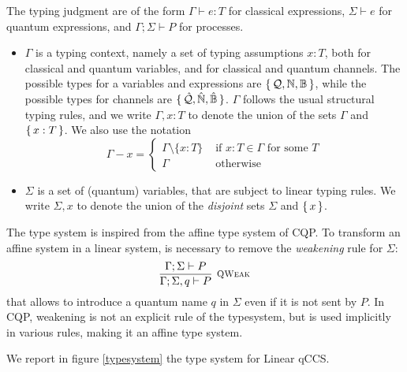 The typing judgment are of the form $\Gamma \vdash e : T$ for classical expressions, $\Sigma \vdash e$ for quantum expressions, and $\Gamma; \Sigma \vdash P$ for processes.
\begin{itemize}
\item $\Gamma$ is a typing context, namely a set of typing assumptions $x:T$, both for classical and quantum variables, and for classical and quantum channels. The possible types for a variables and expressions are $\set{\mathcal{Q}, \mathbb{N}, \mathbb{B}}$, while the possible types for channels are $\set{\hat{\mathcal{Q}}, \hat{\mathbb{N}}, \hat{\mathbb{B}}}$. $\Gamma$ follows the usual structural typing rules, and we write $\Gamma, x: T$ to denote the union of the sets $\Gamma$ and $\set{x: T}$. We also use the notation
\[\Gamma - x = \begin{cases}
\Gamma \setminus \{x : T\} &\text{ if } x: T \in \Gamma \text{ for some } T \\
\Gamma &\text{ otherwise}
\end{cases}\]
\item $\Sigma$ is a set of (quantum) variables, that are subject to linear typing rules. We write $\Sigma, x$ to denote the union of the \textit{disjoint} sets $\Sigma$ and $\set{x}$.
\end{itemize}

The type system is inspired from the affine type system of CQP. To transform an affine system in a linear system, is necessary to remove the \textit{weakening} rule for $\Sigma$:
\[ \infer[\mbox{\footnotesize\scshape QWeak}]{\Gamma; \Sigma,q \vdash P}{\Gamma; \Sigma \vdash P}
\]
that allows to introduce a quantum name $q$ in $\Sigma$ even if it is not sent by $P$. In CQP, weakening is not an explicit rule of the typesystem, but is used implicitly in various rules, making it an affine type system.

We report in figure \ref{typesystem} the type system for Linear qCCS.

